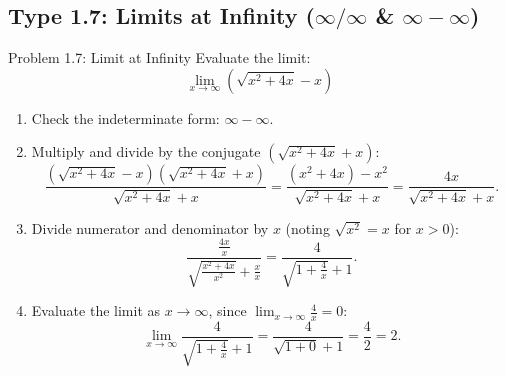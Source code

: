 \documentclass[11pt,a4paper]{article}
\begin{document}
\subsection{Type 1.7: Limits at Infinity ($\infty/\infty$ \& $\infty - \infty$)}
\begin{problembox}{Problem 1.7: Limit at Infinity}
Evaluate the limit:
\[
\lim_{x \to \infty} \left( \sqrt{x^2 + 4x} - x \right)
\]
\end{problembox}
\begin{solutionbox}
\begin{enumerate}
	\item [Step 1.] Check the indeterminate form: $\infty - \infty$.
	
	\item [Step 2.] Multiply and divide by the conjugate $(\sqrt{x^2 + 4x} + x)$:
	\begin{equation*}
		\frac{(\sqrt{x^2 + 4x} - x)(\sqrt{x^2 + 4x} + x)}{\sqrt{x^2 + 4x} + x} = \frac{(x^2 + 4x) - x^2}{\sqrt{x^2 + 4x} + x} = \frac{4x}{\sqrt{x^2 + 4x} + x}.
	\end{equation*}

	\item [Step 3.] Divide numerator and denominator by $x$ (noting $\sqrt{x^2} = x$ for $x > 0$):
	\begin{equation*}
		\frac{\frac{4x}{x}}{\sqrt{\frac{x^2 + 4x}{x^2}} + \frac{x}{x}} = \frac{4}{\sqrt{1 + \frac{4}{x}} + 1}.
	\end{equation*}

	\item [Step 4.] Evaluate the limit as $x \to \infty$, since $\lim_{x \to \infty} \frac{4}{x} = 0$:
	\begin{equation*}
		\lim_{x \to \infty} \frac{4}{\sqrt{1 + \frac{4}{x}} + 1} = \frac{4}{\sqrt{1 + 0} + 1} = \frac{4}{2} = 2.
	\end{equation*}
\end{enumerate}
\end{solutionbox}
\end{document}
